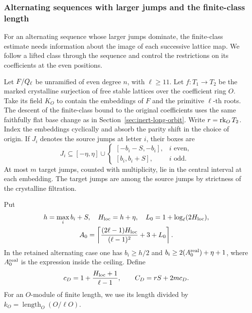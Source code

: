 \subsubsection{Alternating sequences with larger jumps and the finite-class length}
\label{sec:inert-thick-word}
\hypertarget{source-inert-thick-word}{}

For an alternating sequence whose larger jumps dominate, the finite-class estimate needs information about the image of each successive lattice map. We follow a lifted class through the sequence and control the restrictions on its coefficients at the even positions.

\begin{established}\label{hyp:alternating-thick-word}
Let \(F/Q_\ell\) be unramified of even degree \(n\), with
\(\ell\ge11\). Let \(f:T_1\to T_2\) be the marked crystalline surjection of
free stable lattices over the coefficient ring \(O\).
Take its field \(K_O\) to contain the embeddings of \(F\) and
the primitive \(\ell\)-th roots. The descent
of the finite-class bound to the original coefficients uses the same
faithfully flat base change as in Section~\ref{sec:inert-long-orbit}.
Write \(r=\operatorname{rk}_O T_2\). Index the embeddings cyclically and absorb the
parity shift in the choice of origin. If \(J_i\) denotes the source jumps at letter \(i\), their boxes are
\[
 J_i\subseteq[-\eta,\eta]\cup\begin{cases}[-b_i-S,-b_i],&i\text{ even},\\ {}[b_i,b_i+S],&i\text{ odd}.\end{cases}
\]
At most \(m\) target jumps, counted
with multiplicity, lie in the central interval at each embedding.
The target jumps are among the source jumps by strictness of the
crystalline filtration.

Put
\[
\begin{gathered}
 h=\max_i b_i+S,\quad H_{\rm loc}=h+\eta,\quad
 L_0=1+\log_\ell(2H_{\rm loc}),\\
 A_0=\left\lceil\frac{(2\ell-1)H_{\rm loc}}{(\ell-1)^2}
                +3+L_0\right\rceil .
\end{gathered}
\]
In the retained alternating case one has
\(b_i\ge h/2\) and
\(b_i\ge 2(A_0^{\rm real})+\eta+1\), where \(A_0^{\rm real}\) is
the expression inside the ceiling. Define
\[
 c_D=1+\frac{H_{\rm loc}+1}{\ell-1},\qquad
 C_D=rS+2mc_D .
\]
For an \(O\)-module of finite length, we use its length divided by
\(k_O=\operatorname{length}_O(O/\ell O)\).
\end{established}
